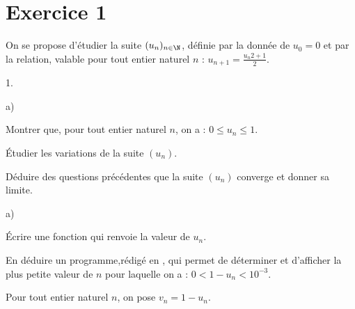 \documentclass[11pt]{article}%
\begin{document}
\indent \vspace{0.3cm}


\vspace{0.5cm}

\section*{Exercice 1}

\noindent On se propose d'étudier la suite $(u_{n})_{n \in \N}$,
définie par la donnée de $u_{0} = 0$ et par la relation, valable pour
tout entier naturel $n$ : $u_{n + 1} = \frac{u_{n}{2} + 1}{2}$.

\begin{noliste}{1.}
 \setlength{\itemsep}{4mm}

\item \begin{noliste}{a)}
 \setlength{\itemsep}{2mm}

\item Montrer que, pour tout entier naturel $n$, on a : $0 \leq u_{n}
\leq 1$. 

\item Étudier les variations de la suite $(u_{n})$. 

\item Déduire des questions précédentes que la suite $(u_{n})$ converge
et donner sa limite. \\

\end{noliste}

\item \begin{noliste}{a)}
 \setlength{\itemsep}{2mm}

\item Écrire une fonction \Scilab{} qui renvoie la valeur de $u_{n}$.

\item En déduire un programme,rédigé en \Scilab{}, qui permet de
déterminer et d'afficher la plus petite valeur de $n$ pour laquelle on
a : $0 < 1 - u_{n} < 10^{-3}$. \\

\end{noliste}

\item Pour tout entier naturel $n$, on pose $v_{n} = 1 - u_{n}$.


\end{noliste}
\end{document}
